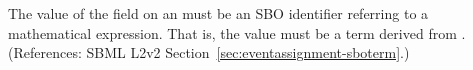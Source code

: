 The value of the  field on an \EventAssignment must be an
SBO identifier referring to a mathematical expression.  That is, the value
must be a term derived from \sbomathformula.  (References: SBML L2v2
Section~\ref{sec:eventassignment-sboterm}.)
